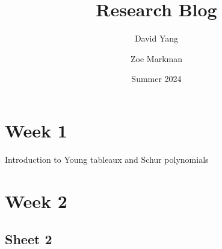 \documentclass[11pt]{article}
\begin{document}
\title{\textbf{Research Blog}}
\author{David Yang \and Zoe Markman}
\date{Summer 2024}

\maketitle

\section{Week 1}
Introduction to Young tableaux and Schur polynomials

\section{Week 2}


\subsection{Sheet 2}

\end{document}
